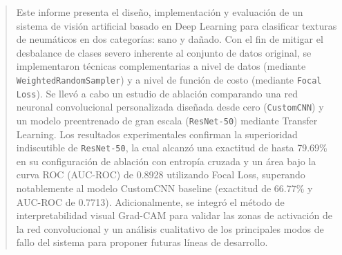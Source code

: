 \begin{abstract}
    Este informe presenta el diseño, implementación y evaluación de un sistema de visión artificial basado en Deep Learning para clasificar texturas de neumáticos en dos categorías: sano y dañado. Con el fin de mitigar el desbalance de clases severo inherente al conjunto de datos original, se implementaron técnicas complementarias a nivel de datos (mediante \texttt{WeightedRandomSampler}) y a nivel de función de costo (mediante \texttt{Focal Loss}). Se llevó a cabo un estudio de ablación comparando una red neuronal convolucional personalizada diseñada desde cero (\texttt{CustomCNN}) y un modelo preentrenado de gran escala (\texttt{ResNet-50}) mediante Transfer Learning. Los resultados experimentales confirman la superioridad indiscutible de \texttt{ResNet-50}, la cual alcanzó una exactitud de hasta 79.69\% en su configuración de ablación con entropía cruzada y un área bajo la curva ROC (AUC-ROC) de 0.8928 utilizando Focal Loss, superando notablemente al modelo CustomCNN baseline (exactitud de 66.77\% y AUC-ROC de 0.7713). Adicionalmente, se integró el método de interpretabilidad visual Grad-CAM para validar las zonas de activación de la red convolucional y un análisis cualitativo de los principales modos de fallo del sistema para proponer futuras líneas de desarrollo.
\end{abstract}